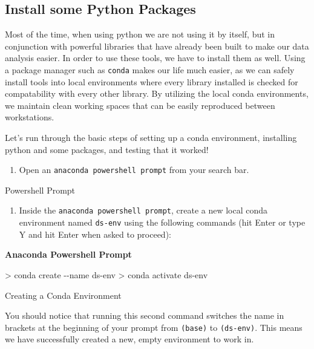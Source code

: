 \documentclass[
  letterpaper,
  DIV=11,
  numbers=noendperiod]{scrreprt}
\newenvironment{Shaded}{\begin{snugshade}}{\end{snugshade}}
\newcommand{\AttributeTok}[1]{\textcolor[rgb]{0.40,0.45,0.13}{#1}}
\newcommand{\ExtensionTok}[1]{\textcolor[rgb]{0.00,0.23,0.31}{#1}}
\newcommand{\NormalTok}[1]{\textcolor[rgb]{0.00,0.23,0.31}{#1}}
\newcommand{\OperatorTok}[1]{\textcolor[rgb]{0.37,0.37,0.37}{#1}}
\providecommand{\tightlist}{%
  \setlength{\itemsep}{0pt}\setlength{\parskip}{0pt}}\usepackage{longtable,booktabs,array}
\begin{document}
\hypertarget{install-some-python-packages}{%
\subsection{Install some Python
Packages}\label{install-some-python-packages}}

Most of the time, when using python we are not using it by itself, but
in conjunction with powerful libraries that have already been built to
make our data analysis easier. In order to use these tools, we have to
install them as well. Using a package manager such as \texttt{conda}
makes our life much easier, as we can safely install tools into local
environments where every library installed is checked for compatability
with every other library. By utilizing the local conda environments, we
maintain clean working spaces that can be easily reproduced between
workstations.

Let's run through the basic steps of setting up a conda environment,
installing python and some packages, and testing that it worked!

\begin{enumerate}
\def\labelenumi{\arabic{enumi}.}
\tightlist
\item
  Open an \texttt{anaconda\ powershell\ prompt} from your search bar.
\end{enumerate}

Powershell Prompt

\begin{enumerate}
\def\labelenumi{\arabic{enumi}.}
\setcounter{enumi}{1}
\tightlist
\item
  Inside the \texttt{anaconda\ powershell\ prompt}, create a new local
  conda environment named \texttt{ds-env} using the following commands
  (hit Enter or type Y and hit Enter when asked to proceed):
\end{enumerate}

\textbf{Anaconda Powershell Prompt}

\begin{Shaded}
\begin{Highlighting}[]
\OperatorTok{\textgreater{}}\NormalTok{ conda }\ExtensionTok{create} \AttributeTok{{-}{-}name}\NormalTok{ ds{-}env}
\OperatorTok{\textgreater{}}\NormalTok{ conda }\ExtensionTok{activate}\NormalTok{ ds{-}env}
\end{Highlighting}
\end{Shaded}

Creating a Conda Environment

You should notice that running this second command switches the name in
brackets at the beginning of your prompt from \texttt{(base)} to
\texttt{(ds-env)}. This means we have successfully created a new, empty
environment to work in.
\end{document}
